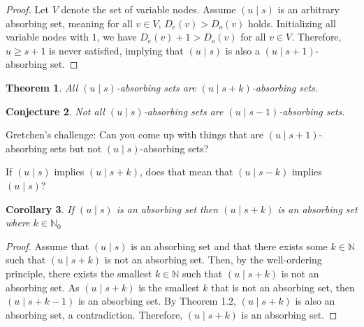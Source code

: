 \documentclass{article}
\newtheorem{thm}{Theorem}[section]
\newtheorem{co}[thm]{Corollary}
\newtheorem{conj}[thm]{Conjecture}
\begin{document}




\begin{proof}
    Let $V$ denote the set of variable nodes. Assume $(u\mid s)$ is an arbitrary absorbing set, meaning for all $v\in V$, $D_e(v)>D_o(v)$ holds. Initializing all variable nodes with $1$, we have $D_e(v)+1>D_o(v)$ for all $v\in V$. Therefore, $u\geq s+1$ is never satisfied, implying that $(u\mid s)$ is also a $(u\mid s+1)$-absorbing set.
\end{proof}
    
    


\begin{thm}
    All $(u\mid s)$-absorbing sets are $(u\mid s+k)$-absorbing sets.
\end{thm}

\begin{conj}
    Not all $(u\mid s)$-absorbing sets are $(u\mid s-1)$-absorbing sets.
\end{conj}

Gretchen's challenge: Can you come up with things that are $(u \mid s + 1)$-absorbing sets but not $(u \mid s)$-absorbing sets?

If $(u \mid s)$ implies $(u \mid s + k)$, does that mean that $(u \mid s - k)$ implies $(u \mid s)$?


\begin{co}
    If $(u\mid s)$ is an absorbing set then $(u\mid s+k)$ is an absorbing set where $k\in \mathbb{N}_0$
\end{co}

\begin{proof}
Assume that $(u\mid s)$ is an absorbing set and that there exists some $k \in \mathbb{N}$ such that $(u\mid s+k)$ is not an absorbing set. Then, by the well-ordering principle, there exists the smallest $k \in \mathbb{N}$ such that $(u\mid s+k)$ is not an absorbing set. As $(u\mid s+k)$ is the smallest $k$ that is not an absorbing set, then $(u\mid s+k-1)$ is an absorbing set. By Theorem 1.2, $(u\mid s+k)$ is also an absorbing set, a contradiction. Therefore, $(u\mid s+k)$ is an absorbing set.
\end{proof}
\end{document}
